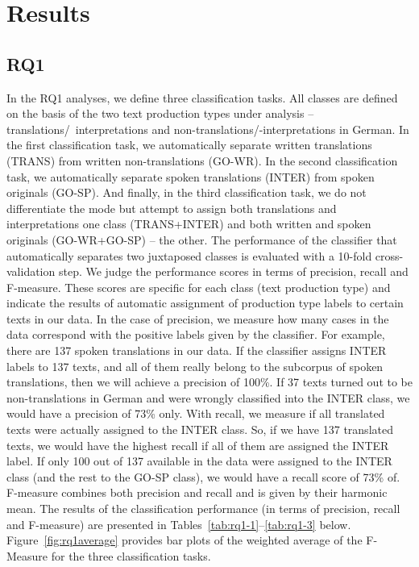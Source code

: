 \documentclass[output=paper,colorlinks,citecolor=brown]{langscibook}
\begin{document}
\section{Results}\label{sec:results}
\largerpage[-1]
\subsection{RQ1}\label{ssec:rq1}
In the RQ1 analyses, we define three classification tasks. All classes are defined on the basis of the two text production types under analysis -- translations/~interpretations and non-translations/-interpretations in German. In the first classification task, we automatically separate written translations (TRANS) from written non-translations (GO-WR). In the second classification task, we automatically separate spoken translations (INTER) from spoken originals (GO-SP). And finally, in the third classification task, we do not differentiate the mode but attempt to assign both translations and interpretations one class (TRANS+INTER) and both written and spoken originals (GO-WR+GO-SP) -- the other. The performance of the classifier that automatically separates two juxtaposed classes is evaluated with a 10-fold cross-validation step. We judge the performance scores in terms of precision, recall and F-measure. These scores are specific for each class (text production type) and indicate the results of automatic assignment of production type labels to certain texts in our data. In the case of precision, we measure how many cases in the data correspond with the positive labels given by the classifier. For example, there are 137 spoken translations in our data. If the classifier assigns INTER labels to 137 texts, and all of them really belong to the subcorpus of spoken translations, then we will achieve a precision of 100\%. If 37 texts turned out to be non-translations in German and were wrongly classified into the INTER class, we would have a precision of 73\% only. With recall, we measure if all translated texts were actually assigned to the INTER class. So, if we have 137 translated texts, we would have the highest recall if all of them are assigned the INTER label. If only 100 out of 137 available in the data were assigned to the INTER class (and the rest to the GO-SP class), we would have a recall score of 73\% of. F-measure combines both precision and recall and is given by their harmonic mean. The results of the classification performance (in terms of precision, recall and F-measure) are presented in Tables~\ref{tab:rq1-1}--\ref{tab:rq1-3} below. Figure~\ref{fig:rq1average} provides bar plots of the weighted average of the F-Measure for the three classification tasks.
\end{document}
